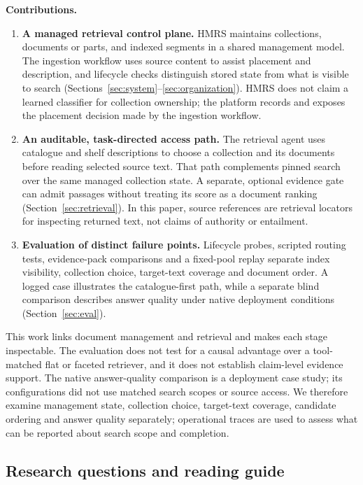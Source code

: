 \ifdefined\HMRSReviewLayout{}\fi
\noindent\textbf{Contributions.}
\begin{enumerate}
\item \textbf{A managed retrieval control plane.} HMRS maintains
collections, documents or parts, and indexed segments in a shared management
model. The ingestion workflow uses source content to assist placement and
description, and lifecycle checks distinguish stored state from what is visible
to search (Sections~\ref{sec:system}--\ref{sec:organization}). HMRS does not
claim a learned classifier for collection ownership; the platform records and
exposes the placement decision made by the ingestion workflow.
\item \textbf{An auditable, task-directed access path.} The retrieval
agent uses catalogue and shelf descriptions to choose a collection and its
documents before reading selected source text. That path complements pinned
search over the same managed collection state. A separate, optional evidence
gate can admit passages without treating its score as a document ranking
(Section~\ref{sec:retrieval}). In this paper, source references are retrieval
locators for inspecting returned text, not claims of authority or entailment.
\item \textbf{Evaluation of distinct failure points.} Lifecycle probes,
scripted routing tests, evidence-pack comparisons and a fixed-pool replay
separate index visibility, collection choice, target-text coverage and
document order. A logged case illustrates the catalogue-first path, while
a separate blind comparison describes answer quality under native deployment
conditions (Section~\ref{sec:eval}).
\end{enumerate}

This work links document management and retrieval and makes each stage
inspectable. The evaluation does not test for a causal advantage over a
tool-matched flat or faceted retriever, and it does not establish claim-level
evidence support. The native answer-quality comparison is a deployment case
study; its configurations did not use matched search scopes or source access.
We therefore examine management state, collection choice, target-text coverage,
candidate ordering and answer quality separately; operational traces are used
to assess what can be reported about search scope and completion.

\subsection{Research questions and reading guide}
\label{sec:rq}

